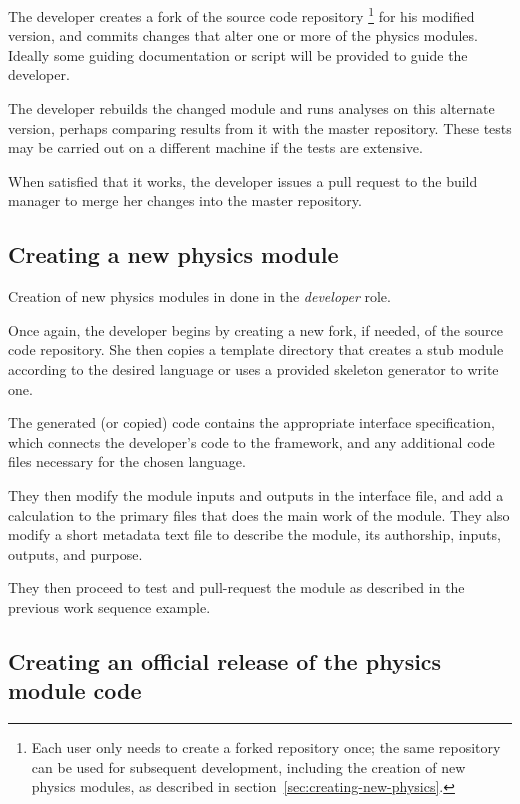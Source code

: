 \documentclass[draftmode,draftwater]{memarticle}
\begin{document}
The developer creates a fork of the source code repository%
\footnote{Each user only needs to create a forked repository once; the
  same repository can be used for subsequent development, including the
  creation of new physics modules, as described in
  section~\ref{sec:creating-new-physics}.}
for his modified version,
and commits changes that alter one or more of the physics modules.
Ideally some guiding documentation or script will be provided to guide
the developer.

The developer rebuilds the changed module and runs analyses on this
alternate version, perhaps comparing results from it with the
master repository.  These tests may be carried out on a different machine if the
tests are extensive.

When satisfied that it works, the developer issues a pull
request to the build manager to merge her changes into the master
repository.

\subsection{Creating a new physics module\label{sec:creating-new-physics}}

Creation of new physics modules in done in the \emph{developer} role.

Once again, the developer begins by creating a new fork, if needed, of the source code
repository. She then copies a template directory
that creates a stub module according to the desired language or uses a provided skeleton generator to write one.

The generated (or copied) code contains the appropriate interface
specification,
which connects the developer's code to the
framework, and any additional code files necessary for the chosen language.

They then modify the module inputs and outputs in the interface file,
and add a
calculation to the primary files that does the main work of the module.
They also modify a short metadata text file to describe the
module, its authorship, inputs, outputs, and purpose.

They then proceed to test and pull-request the module as described in the
previous work sequence example.

\subsection{Creating an official release of the physics module code}
\end{document}
